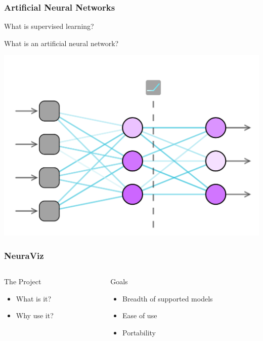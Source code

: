 \documentclass{beamer}
\begin{document}
\begin{frame}
    \frametitle{Artificial Neural Networks}
    \begin{block}{}
        What is supervised learning?
    \end{block}
    \begin{block}{}
        What is an artificial neural network?
    \end{block}
    \centering
    \includegraphics[scale=0.15]{../01_introduction/res/neural_network.png}
\end{frame}

\begin{frame}
    \frametitle{NeuraViz}
    \begin{columns}
        \begin{column}{0.5\textwidth}
            \begin{block}{The Project}
                \begin{itemize}
                    \item What is it? \pause
                    \item Why use it?
                \end{itemize}
            \end{block}
        \end{column}
        \pause
        \begin{column}{0.5\textwidth}
            \begin{block}{Goals}
                \begin{itemize}
                    \item Breadth of supported models \pause
                    \item Ease of use \pause
                    \item Portability
                \end{itemize}
            \end{block}
        \end{column}
    \end{columns}
\end{frame}
    
\end{document}
